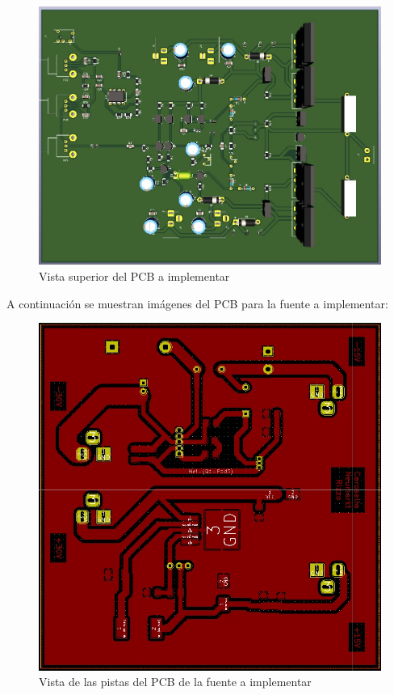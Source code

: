 \begin{figure}[H]
        \centering
        \includegraphics[scale=0.3]{./PCB2.jpeg}
        \caption{Vista superior del PCB a implementar}
        \label{fig::PCB2}
\end{figure}

A continuación se muestran imágenes del PCB para la fuente a implementar:

\begin{figure}[H]
        \centering
        \includegraphics[scale=0.2]{./PCB_fuente1.jpeg}
        \caption{Vista de las pistas del PCB de la fuente a implementar}
        \label{fig::PCB1}
\end{figure}

